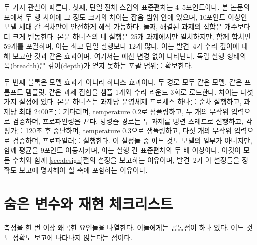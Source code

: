 두 가지 관찰이 따른다. 첫째, 단일 전체 스윕의 표준편차는 4--5포인트이다. 본 논문의 표에서 두 행
사이에 그 정도 크기의 차이는 잡음 범위 안에 있으며, 10포인트 이상인 모델 세대 간 격차만이 안전하게
해석 가능하다. 둘째, 해결된 과제의 집합은 개수보다 더 크게 변동한다. 본문 하니스의 네 실행은 25개
과제에서만 일치하지만, 함께 합치면 59개를 포괄하며, 이는 최고 단일 실행보다 12개 많다. 이는 발견~4가
수리 깊이에 대해 보고한 것과 같은 효과이며, 여기서는 예산 변경 없이 나타난다. 독립 실행 형태의
폭(breadth)은 깊이(depth)가 얻지 못하는 포괄 범위를 확보한다.

두 번째 블록은 모델 효과가 아니라 하니스 효과이다. 두 경로 모두 같은 모델, 같은 프롬프트 템플릿,
같은 과제 집합을 샘플 1개와 수리 라운드 3회로 로드한다. 차이는 다섯 가지 설정에 있다. 본문 하니스는
과제당 운영체제 프로세스 하나를 순차 실행하고, 과제당 최대 2400초를 기다리며, temperature 0.2로
샘플링하고, 두 개의 무작위 입력으로 검증하며, 프로파일링을 끈다. 명령줄 경로는 두 과제를 병렬
스레드로 실행하고, 각 평가를 120초 후 중단하며, temperature 0.3으로 샘플링하고, 다섯 개의 무작위
입력으로 검증하며, 프로파일러를 실행한다. 이 설정들 중 어느 것도 모델의 일부가 아니지만, 함께
평균을 9포인트 이동시키며, 이는 실행 간 표준편차의 두 배 이상이다. 이것이 모든 수치와 함께
\ref{sec:design}절의 설정을 보고하는 이유이며, 발견~2가 이 설정들을 정확도 보고에 명시해야 할 축에
포함하는 이유이다.

\section{숨은 변수와 재현 체크리스트}

측정을 한 번 이상 왜곡한 요인들을 나열한다. 이들에게는 공통점이 하나 있다.
어느 것도 정확도 보고에 나타나지 않는다는 점이다.

